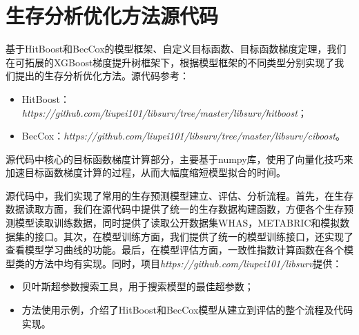 
\thesisappendix

\chapter{生存分析优化方法源代码}

基于HitBoost和BecCox的模型框架、自定义目标函数、目标函数梯度定理，我们在可拓展的XGBoost梯度提升树框架下，根据模型框架的不同类型分别实现了我们提出的生存分析优化方法。源代码参考：
\begin{itemize}
  \item HitBoost：\emph{https://github.com/liupei101/libsurv/tree/master/libsurv/hitboost}；
  \item BecCox：\emph{https://github.com/liupei101/libsurv/tree/master/libsurv/ciboost}。
\end{itemize}
源代码中核心的目标函数梯度计算部分，主要基于numpy库，使用了向量化技巧来加速目标函数梯度计算的过程，从而大幅度缩短模型拟合的时间。

源代码中，我们实现了常用的生存预测模型建立、评估、分析流程。首先，在生存数据读取方面，我们在源代码中提供了统一的生存数据构建函数，方便各个生存预测模型读取训练数据，同时提供了读取公开数据集WHAS，METABRIC和模拟数据集的接口。其次，在模型训练方面，我们提供了统一的模型训练接口，还实现了查看模型学习曲线的功能。最后，在模型评估方面，一致性指数计算函数在各个模型类的方法中均有实现。同时，项目\emph{https://github.com/liupei101/libsurv}提供：
\begin{itemize}
  \item 贝叶斯超参数搜索工具，用于搜索模型的最佳超参数；
  \item 方法使用示例，介绍了HitBoost和BecCox模型从建立到评估的整个流程及代码实现。
\end{itemize}